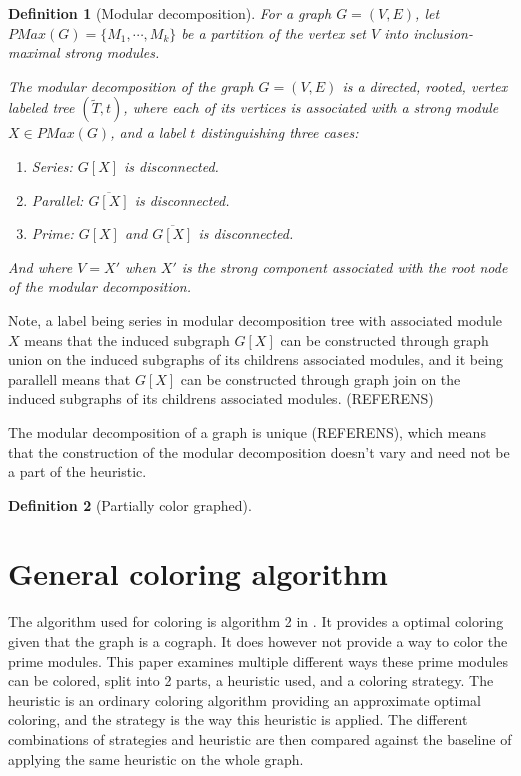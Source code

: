\documentclass{amsart}
\newtheorem{definition}{Definition}[section]
\begin{document}
\begin{definition}[Modular decomposition]
    For a graph $G = (V,E)$, let $PMax(G) = \{M_1,\cdots,M_k\}$ be a partition of the vertex set $V$ 
    into inclusion-maximal strong modules.
    
    The modular decomposition of the graph $G = (V,E)$ is a directed, rooted, vertex labeled tree
    $(\widetilde{T},t)$, where each of its vertices is associated with a strong
    module $X \in PMax(G)$, and a label $t$ distinguishing  three cases:

    \begin{enumerate}
        \item Series: $G[X]$ is disconnected.
        \item Parallel: $\overline{G[X]}$ is disconnected.
        \item Prime: $G[X]$ and $\overline{G[X]}$ is disconnected.
    \end{enumerate}

    And where $V = X'$ when $X'$ is the strong component associated with the
    root node of the modular decomposition.
\end{definition}

Note, a label being series in modular decomposition tree with associated module
$X$ means that the induced subgraph $G[X]$ can be constructed through graph
union on the induced subgraphs of its childrens associated modules, and it being
parallell means that $G[X]$ can be constructed through graph join on the
induced subgraphs of its childrens associated modules. (REFERENS)

The modular decomposition of a graph is unique (REFERENS), which means that the
construction of the modular decomposition doesn't vary and need not be a part of
the heuristic.


\begin{definition}[Partially color graphed]


\end{definition}

\section{General coloring algorithm}

The algorithm used for coloring is algorithm 2 in \cite{HCL}. It provides a
optimal coloring given that the graph is a cograph. It does however not
provide a way to color the prime modules. This paper examines multiple different
ways these prime modules can be colored, split into 2 parts, a heuristic used,
and a coloring strategy. The heuristic is an ordinary coloring algorithm
providing an approximate optimal coloring, and the strategy is the way this
heuristic is applied. The different combinations of strategies and heuristic are
then compared against the baseline of applying the same heuristic on the whole
graph.
\end{document}
